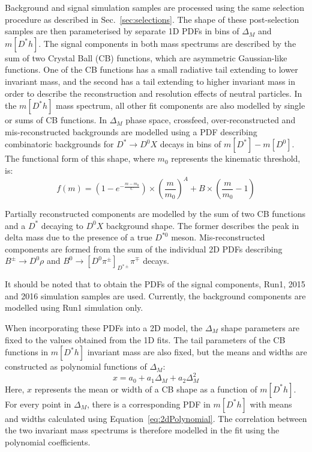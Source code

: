 \documentclass[oneside,12pt]{article}
\begin{document}
Background and signal simulation samples are processed using the same selection
procedure as described in Sec.~\ref{sec:selections}. The shape of these
post-selection samples are then parameterised by separate 1D PDFs in bins of
$\Delta_M$ and $m[D^*h]$. The signal components in both mass spectrums are
described by the sum of two Crystal Ball (CB) functions, which are asymmetric
Gaussian-like functions. One of the CB functions has a small radiative tail
extending to lower invariant mass, and the second has a tail extending to higher
invariant mass in order to describe the reconstruction and resolution effects of
neutral particles. In the $m[D^*h]$ mass spectrum, all other fit components are
also modelled by single or sums of CB functions. In $\Delta_M$ phase space,
crossfeed, over-reconstructed and mis-reconstructed backgrounds are modelled
using a PDF describing combinatoric backgrounds for $D^{*}\rightarrow D^{0}X$
decays in bins of $m[D^*]-m[D^0]$. The functional form of this shape, where $m_0$
represents the kinematic threshold, is:
\begin{equation}
f(m)=\left(  1-e^{-\frac{m-m_0}{C}}\right) \times\left(  \frac{m}{m_0}\right) ^A+B\times\left(  \frac{m}{m_0}-1\right) 
\label{eq:DstD0BG}
\end{equation}

Partially reconstructed components are modelled by the sum of two CB functions
and a $D^*$ decaying to $D^0X$ background shape. The former describes the peak
in delta mass due to the presence of a true $D^{*0}$ meson. Mis-reconstructed
components are formed from the sum of the individual 2D PDFs describing
$B^{\pm}\rightarrow D^0\rho$ and
$B^{0}\rightarrow[D^0\pi^{\pm}]_{D^{*\pm}}\pi^{\mp}$ decays.

It should be noted that to obtain the PDFs of the signal components, Run1, 2015 and 2016 simulation samples are used. Currently, the background components are modelled using Run1 simulation only. 

When incorporating these PDFs into a 2D model, the $\Delta_M$ shape parameters
are fixed to the values obtained from the 1D fits. The tail parameters of the CB
functions in $m[D^*h]$ invariant mass are also fixed, but the means and widths
are constructed as polynomial functions of $\Delta_M$:  
\begin{equation}
x = a_0 + a_1 \Delta_M + a_2 \Delta_M^2
\label{eq:2dPolynomial}
\end{equation}
Here, $x$ represents the mean or width of a CB shape as a function of $m[D^*h]$.
For every point in $\Delta_M$, there is a corresponding PDF in $m[D^*h]$ with
means and widths calculated using Equation~\ref{eq:2dPolynomial}. The
correlation between the two invariant mass spectrums is therefore modelled in
the fit using the polynomial coefficients.
\end{document}
